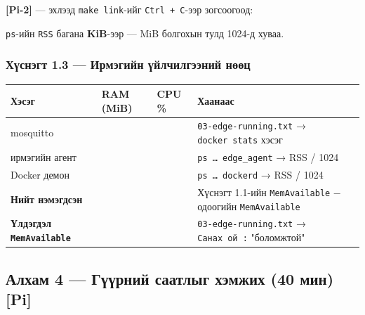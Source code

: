 \textbf{{[}Pi-2{]}} --- эхлээд \texttt{make\ link}-ийг \texttt{Ctrl\ +\ C}-ээр зогсоогоод:

\begin{Shaded}
\begin{Highlighting}[]
\KeywordTok{|} 
\KeywordTok{|} 
\end{Highlighting}
\end{Shaded}

\texttt{ps}-ийн \texttt{RSS} багана \textbf{KiB}-ээр --- MiB болгохын тулд 1024-д хуваа.

\hypertarget{ux445ux4afux441ux43dux44dux433ux442-1.3-ux438ux440ux43cux44dux433ux438ux439ux43d-ux4afux439ux43bux447ux438ux43bux433ux44dux44dux43dux438ux439-ux43dux4e9ux4e9ux446}{%
\subsubsection{Хүснэгт 1.3 --- Ирмэгийн үйлчилгээний нөөц}\label{ux445ux4afux441ux43dux44dux433ux442-1.3-ux438ux440ux43cux44dux433ux438ux439ux43d-ux4afux439ux43bux447ux438ux43bux433ux44dux44dux43dux438ux439-ux43dux4e9ux4e9ux446}}

\begingroup\scriptsize\begin{longtable}[]{@{}llll@{}}
\toprule
Хэсэг & RAM (MiB) & CPU \% & Хаанаас\tabularnewline
\midrule
\endhead
mosquitto & & & \texttt{03-edge-running.\allowbreak{}txt} → \texttt{docker\ stats} хэсэг\tabularnewline
ирмэгийн агент & & & \texttt{ps\ \ldots{}\ edge\_\allowbreak{}agent} → RSS / 1024\tabularnewline
Docker демон & & & \texttt{ps\ \ldots{}\ dockerd} → RSS / 1024\tabularnewline
\textbf{Нийт нэмэгдсэн} & & & Хүснэгт 1.1-ийн \texttt{MemAvailable} − одоогийн \texttt{MemAvailable}\tabularnewline
\textbf{Үлдэгдэл \texttt{MemAvailable}} & & & \texttt{03-edge-running.\allowbreak{}txt} → \texttt{Санах\ ой\ :} "боломжтой"\tabularnewline
\bottomrule
\end{longtable}\endgroup

\hypertarget{ux430ux43bux445ux430ux43c-4-ux433ux4afux4afux440ux43dux438ux439-ux441ux430ux430ux442ux43bux44bux433-ux445ux44dux43cux436ux438ux445-40-ux43cux438ux43d-pi}{%
\subsection{Алхам 4 --- Гүүрний саатлыг хэмжих (40 мин) {[}Pi{]}}\label{ux430ux43bux445ux430ux43c-4-ux433ux4afux4afux440ux43dux438ux439-ux441ux430ux430ux442ux43bux44bux433-ux445ux44dux43cux436ux438ux445-40-ux43cux438ux43d-pi}}

